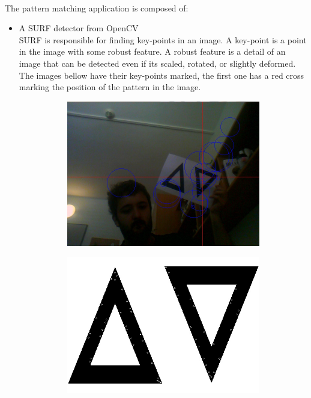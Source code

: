 \documentclass[11pt,twoside,a4paper]{article}
\begin{document}
\paragraph {} The pattern matching application is composed of:
\begin{itemize}
  \item A SURF detector from OpenCV\\
SURF is responsible for finding key-points in an image. A key-point is a point
in the image with some robust feature. A robust feature is a detail of an image
that can be detected even if its scaled, rotated, or slightly deformed.\\
The images bellow have their key-points marked, the first one has a red cross
marking the position of the pattern in the image.
\begin{figure}[hbtp]
  \centering
\begin{subfigure}{1.00\textwidth}
  \centering
  \includegraphics[width=1.0\linewidth]{image_marked.jpg}
\end{subfigure}
\begin{subfigure}{1.00\textwidth}
  \centering
  \includegraphics[width=1.0\linewidth]{template_marked.jpg}
\end{subfigure}
\end{figure}



\end{itemize}
\end{document}
